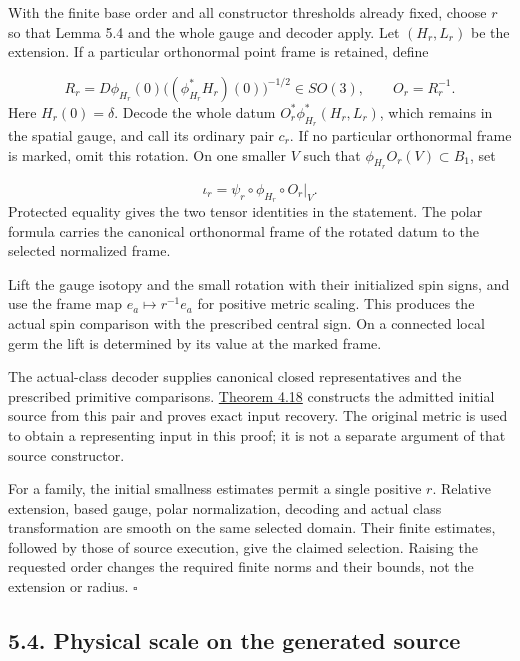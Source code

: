 \documentclass[
  english,
  11pt,
  reqno]{amsart}
\begin{document}
With the finite base order and all constructor thresholds already fixed,
choose \(r\) so that Lemma 5.4 and the whole gauge and decoder apply.
Let \((H_r,L_r)\) be the extension. If a particular orthonormal point
frame is retained, define

\label{eq:submission-polar-frame-correction} \[
R_r
=
D\phi_{H_r}(0)
\bigl((\phi_{H_r}^*H_r)(0)\bigr)^{-1/2}\in SO(3),
\qquad
O_r=R_r^{-1}.
\] Here \(H_r(0)=\delta\). Decode the whole datum
\(O_r^*\phi_{H_r}^*(H_r,L_r)\), which remains in the spatial gauge, and
call its ordinary pair \(c_r\). If no particular orthonormal frame is
marked, omit this rotation. On one smaller \(V\) such that
\(\phi_{H_r}O_r(V)\subset B_1\), set

\label{eq:submission-physical-initial-embedding} \[
\iota_r
=
\psi_r\circ\phi_{H_r}\circ O_r|_V.
\] Protected equality gives the two tensor identities in the statement.
The polar formula carries the canonical orthonormal frame of the rotated
datum to the selected normalized frame.

Lift the gauge isotopy and the small rotation with their initialized
spin signs, and use the frame map \(e_a\mapsto r^{-1}e_a\) for positive
metric scaling. This produces the actual spin comparison with the
prescribed central sign. On a connected local germ the lift is
determined by its value at the marked frame.

The actual-class decoder supplies canonical closed representatives and
the prescribed primitive comparisons.
\hyperref[thm:online-ordinary-negative-response-initial-source]{Theorem
4.18} constructs the admitted initial source from this pair and proves
exact input recovery. The original metric is used to obtain a
representing input in this proof; it is not a separate argument of that
source constructor.

For a family, the initial smallness estimates permit a single positive
\(r\). Relative extension, based gauge, polar normalization, decoding
and actual class transformation are smooth on the same selected domain.
Their finite estimates, followed by those of source execution, give the
claimed selection. Raising the requested order changes the required
finite norms and their bounds, not the extension or radius.
\hfill\(\square\)

\subsection{5.4. Physical scale on the generated
source}\label{physical-scale-on-the-generated-source}\label{sec:submission-coverage-physical-scale}
\end{document}
